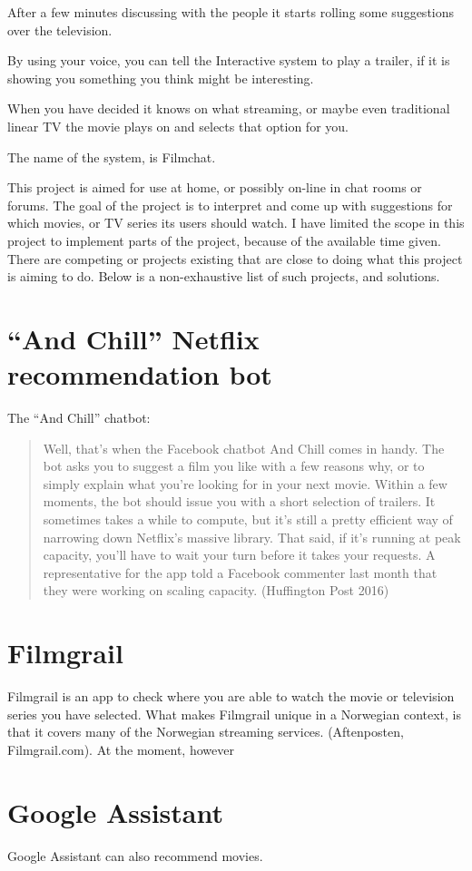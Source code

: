 \documentclass[11pt,fleqn]{book} %
\begin{document}
After a few minutes discussing with the people it starts rolling some suggestions over the television. 

By using your voice, you can tell the Interactive system to play a trailer, if it is showing you something you think might be interesting.

When you have decided it knows on what streaming, or maybe even traditional linear TV the movie plays on and selects that option for you.

The name of the system, is Filmchat.


This project is aimed for use at home, or possibly on-line in chat rooms or forums. The goal of the project is to interpret and come up with suggestions for which movies, or TV series its users should watch. I have limited the scope in this project to implement parts of the project, because of the available time given.
There are competing or projects existing that are close to doing what this project is aiming to do. Below is a non-exhaustive list of such projects, and solutions.
\section{“And Chill” Netflix recommendation bot}
The “And Chill” chatbot:
\begin{quote}
Well, that’s when the Facebook chatbot And Chill comes in handy. The bot asks you to suggest a film you like with a few reasons why, or to simply explain what you’re looking for in your next movie.  
Within a few moments, the bot should issue you with a short selection of trailers. It sometimes takes a while to compute, but it’s still a pretty efficient way of narrowing down Netflix’s massive library.
That said, if it’s running at peak capacity, you’ll have to wait your turn before it takes your requests. A representative for the app told a Facebook commenter last month that they were working on scaling capacity. (Huffington Post 2016)
\end{quote}
\section{Filmgrail}
Filmgrail is an app to check where you are able to watch the movie or television series you have selected. What makes Filmgrail unique in a Norwegian context, is that it covers many of the Norwegian streaming services. (Aftenposten, Filmgrail.com). At the moment, however 
\section{Google Assistant}
Google Assistant can also recommend movies.
\end{document}
